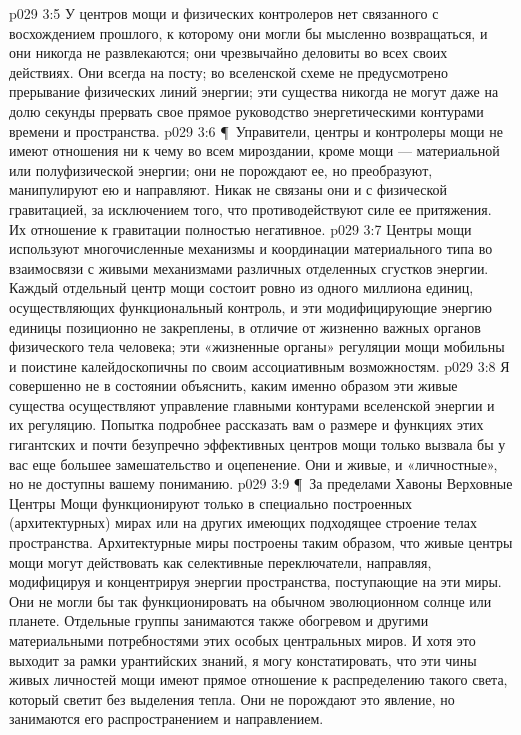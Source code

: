 \vs p029 3:5 У центров мощи и физических контролеров нет связанного с восхождением прошлого, к которому они могли бы мысленно возвращаться, и они никогда не развлекаются; они чрезвычайно деловиты во всех своих действиях. Они всегда на посту; во вселенской схеме не предусмотрено прерывание физических линий энергии; эти существа никогда не могут даже на долю секунды прервать свое прямое руководство энергетическими контурами времени и пространства.
\vs p029 3:6 \P\ Управители, центры и контролеры мощи не имеют отношения ни к чему во всем мироздании, кроме мощи --- материальной или полуфизической энергии; они не порождают ее, но преобразуют, манипулируют ею и направляют. Никак не связаны они и с физической гравитацией, за исключением того, что противодействуют силе ее притяжения. Их отношение к гравитации полностью негативное.
\vs p029 3:7 Центры мощи используют многочисленные механизмы и координации материального типа во взаимосвязи с живыми механизмами различных отделенных сгустков энергии. Каждый отдельный центр мощи состоит ровно из одного миллиона единиц, осуществляющих функциональный контроль, и эти модифицирующие энергию единицы позиционно не закреплены, в отличие от жизненно важных органов физического тела человека; эти «жизненные органы» регуляции мощи мобильны и поистине калейдоскопичны по своим ассоциативным возможностям.
\vs p029 3:8 Я совершенно не в состоянии объяснить, каким именно образом эти живые существа осуществляют управление главными контурами вселенской энергии и их регуляцию. Попытка подробнее рассказать вам о размере и функциях этих гигантских и почти безупречно эффективных центров мощи только вызвала бы у вас еще большее замешательство и оцепенение. Они и живые, и «личностные», но не доступны вашему пониманию.
\vs p029 3:9 \P\ За пределами Хавоны Верховные Центры Мощи функционируют только в специально построенных (архитектурных) мирах или на других имеющих подходящее строение телах пространства. Архитектурные миры построены таким образом, что живые центры мощи могут действовать как селективные переключатели, направляя, модифицируя и концентрируя энергии пространства, поступающие на эти миры. Они не могли бы так функционировать на обычном эволюционном солнце или планете. Отдельные группы занимаются также обогревом и другими материальными потребностями этих особых центральных миров. И хотя это выходит за рамки урантийских знаний, я могу констатировать, что эти чины живых личностей мощи имеют прямое отношение к распределению такого света, который светит без выделения тепла. Они не порождают это явление, но занимаются его распространением и направлением.
